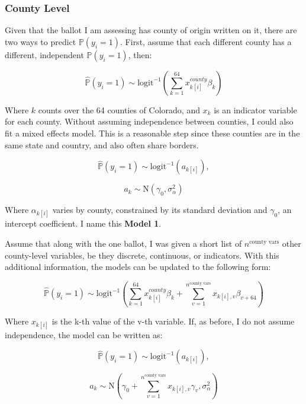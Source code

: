 \documentclass[12pt,twoside]{reedthesis}
\begin{document}
  \subsubsection{County Level}\label{county-level}
  
  Given that the ballot I am assessing has county of origin written on it,
  there are two ways to predict \(\mathbb{P}(y_i = 1)\). First, assume
  that each different county has a different, independent
  \(\mathbb{P}(y_i = 1)\), then:
  
  \[\hat{\mathbb{P}}(y_i = 1) \sim \text{logit}^{-1}(\sum_{k = 1}^{64}x_{k[i]}^{county}\beta_{k})\]
  
  Where \(k\) counts over the 64 counties of Colorado, and \(x_{k}\) is an
  indicator variable for each county. Without assuming independence
  between counties, I could also fit a mixed effects model. This is a
  reasonable step since these counties are in the same state and country,
  and also often share borders.
  
  \begin{equation} \tag{Model 1}
  \hat{\mathbb{P}}(y_i = 1) \sim \text{logit}^{-1}(a_{k[i]}),
  \end{equation}
  
  \[a_{k} \sim \text{N}(\gamma_0, \sigma_{\alpha}^2)\]
  
  Where \(\alpha_{k[i]}\) varies by county, constrained by its standard
  deviation and \(\gamma_0\), an intercept coefficient. I name this
  \textbf{Model 1}.
  
  Assume that along with the one ballot, I was given a short list of
  \(n^{\text{county vars}}\) other county-level variables, be they
  discrete, continuous, or indicators. With this additional information,
  the models can be updated to the following form:
  
  \[\hat{\mathbb{P}}(y_i = 1) \sim \text{logit}^{-1}(\sum_{k = 1}^{64}x_{k[i]}^{county}\beta_{k} + \sum_{v=1}^{n^{\text{county vars}}}x_{k[i], v}\beta_{v+64})\]
  
  Where \(x_{k[i]}\) is the k-th value of the v-th variable. If, as
  before, I do not assume independence, the model can be written as:
  
  \begin{equation} \tag{Model 2}  
  \hat{\mathbb{P}}(y_i = 1) \sim \text{logit}^{-1}(a_{k[i]}),
  \end{equation}
  
  \[a_{k} \sim \text{N}(\gamma_0 + \sum_{v=1}^{n^{\text{county vars}}}x_{k[i], v}\gamma_{v}, \sigma_{\alpha}^2)\]
  
\end{document}
